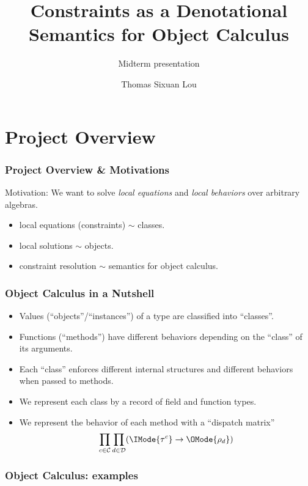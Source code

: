 \documentclass[xcolor=dvipsnames]{beamer}
\begin{document}
\title{Constraints as a Denotational Semantics for Object Calculus}
\subtitle{Midterm presentation}
\author{Thomas Sixuan Lou}

\frame{\titlepage}

\section{Project Overview}

\begin{frame}
  \frametitle{Project Overview \& Motivations}
  Motivation: We want to solve \emph{local equations} and \emph{local behaviors}
  over arbitrary algebras.

  \bigskip

  \pause

  \begin{itemize}
    \item local equations (constraints) $\sim$ classes.
      \pause
    \item local solutions $\sim$ objects.
      \pause
    \item constraint resolution $\sim$ semantics for object calculus.
  \end{itemize}

\end{frame}

\begin{frame}
  \frametitle{Object Calculus in a Nutshell}

  \begin{itemize}
    \item Values (``objects''/``instances'') of a type are classified into ``classes''.
      \pause
    \item Functions (``methods'') have different behaviors depending on the ``class'' of its arguments.
      \pause
    \item Each ``class'' enforces different internal structures and different behaviors when passed to methods.
      \pause
    \item We represent each class by a record of field and function types.
      \pause
    \item We represent the behavior of each method with a ``dispatch matrix''
      \[ \prod_{c \in \mathcal{C}} \prod_{d \in \mathcal{D}} ( \IMode{\tau^c} \to \OMode{\rho_d}) \]
  \end{itemize}

\end{frame}

\begin{frame}
  \frametitle{Object Calculus: examples}
  
\end{frame}
\end{document}
